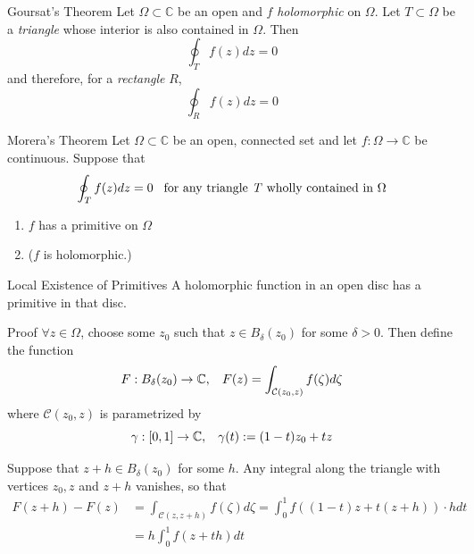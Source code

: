 \documentclass{beamer}
\begin{document}
\begin{frame}
\begin{block}{Goursat's Theorem}
Let $\Omega\subset\mathbb{C}$ be an open and $f$ \textcolor[rgb]{0,0.6,0.3}{\textit{holomorphic}} on $\Omega$. Let $T\subset\Omega$ be a \textcolor[rgb]{0,0.6,0.3}{\textit{triangle}} whose interior is also contained in $\Omega$. Then
$$\oint_Tf(z)dz=0$$
and therefore, for a \textcolor[rgb]{0,0.6,0.3}{\textit{rectangle}} $R$,
$$\oint_Rf(z)dz=0$$
\end{block}
\end{frame}

\begin{frame}
\begin{block}{Morera's Theorem}
Let $\Omega\subset\mathbb{C}$ be an open, connected set and let $f : \Omega \rightarrow \mathbb{C}$ be continuous. Suppose that 
$$\oint_Tf(z) dz = 0\hspace{3mm} \text{for any triangle \textit{T} wholly contained in }\Omega$$
\begin{enumerate}
\item $f$ has a primitive on $\Omega$
\item ($f$ is holomorphic.) 
\end{enumerate}
\end{block}
\begin{block}{Local Existence of Primitives}
A holomorphic function in an open disc has a primitive in that disc.
\end{block}
\end{frame}

\begin{frame}
\begin{block}{Proof}
$\forall z\in\Omega$, choose some $z_0$ such that $z\in B_{\delta}(z_0)$ for some $\delta>0$. Then define the function
$$F:B_{\delta}(z_0)\rightarrow\mathbb{C},\hspace{3mm}F(z)=\int_{\mathcal{C}(z_0,z)}f(\zeta)d\zeta$$
where $\mathcal{C}(z_0,z)$ is parametrized by 
$$\gamma:[0,1]\rightarrow\mathbb{C},\hspace{3mm}\gamma(t):=(1-t)z_0+tz$$

Suppose that $z+h\in B_{\delta}(z_0)$ for some $h$. Any integral along the triangle with vertices $z_0,z$ and $z+h$ vanishes, so that
\begin{align*}
F(z+h)-F(z)&=\int_{\mathcal{C}(z,z+h)}f(\zeta)d\zeta=\int_0^1f((1-t)z+t(z+h))\cdot hdt\\
&=h\int_0^1f(z+th)dt
\end{align*}
\end{block}
\end{frame}
\end{document}
